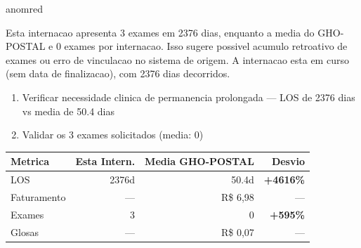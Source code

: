\documentclass[a4paper,10pt]{article}
\begin{document}
\begin{anomalycard}[Internacao 116 | GHO-POSTAL | CRITICO (z=5.11)]{anomred}
\vspace{2pt}\begin{tcolorbox}[colback=severityred!20,colframe=anomred,title={\textbf{Interpretacao de Negocio}},fonttitle=\bfseries\small,left=4pt,right=4pt,top=3pt,bottom=3pt]
{\small Esta internacao apresenta 3 exames em 2376 dias, enquanto a media do GHO-POSTAL e 0 exames por internacao. Isso sugere possivel acumulo retroativo de exames ou erro de vinculacao no sistema de origem. A internacao esta em curso (sem data de finalizacao), com 2376 dias decorridos.}
\end{tcolorbox}
\begin{tcolorbox}[colback=severityyellow!30,colframe=anomorange,title={\textbf{Recomendacoes Especificas}},fonttitle=\bfseries\small,left=4pt,right=4pt,top=3pt,bottom=3pt]
\begin{enumerate}[nosep,leftmargin=16pt]
\item {\small Verificar necessidade clinica de permanencia prolongada --- LOS de 2376 dias vs media de 50.4 dias}
\item {\small Validar os 3 exames solicitados (media: 0)}
\end{enumerate}
\end{tcolorbox}
\begin{center}\begin{tabular}{l r r r}\toprule\textbf{Metrica} & \textbf{Esta Intern.} & \textbf{Media GHO-POSTAL} & \textbf{Desvio} \\\midrule
LOS & 2376d & 50.4d & \textcolor{anomred}{\textbf{+4616\%}} \\
Faturamento & --- & R\$ 6,98 & --- \\
Exames & 3 & 0 & \textcolor{anomred}{\textbf{+595\%}} \\
Glosas & --- & R\$ 0,07 & --- \\
\bottomrule\end{tabular}\end{center}


\end{anomalycard}
\end{document}
